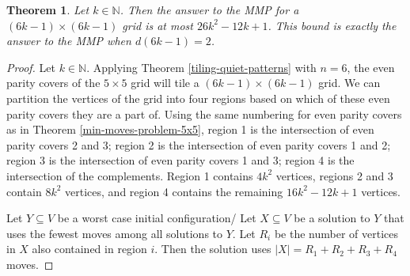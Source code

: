 \documentclass[a4paper]{article}
\newtheorem{theorem}{Theorem}
\newcommand{\N}{\mathbb{N}}
\newcommand{\abs}[1]{\left| #1 \right|}
\begin{document}
	\begin{theorem}\label{min-moves-problem-6k-1x6k-1}
		Let $k \in \N$.
		Then the answer to the MMP for a $(6k - 1) \times (6k - 1)$ grid is at most $26k^2 - 12k + 1$.
		This bound is exactly the answer to the MMP when $d(6k-1)=2$.
	\end{theorem}
	\begin{proof}
		Let $k \in \N$.
		Applying Theorem \ref{tiling-quiet-patterns} with $n=6$, the even parity covers of the $5 \times 5$ grid will tile a $(6k - 1) \times (6k - 1)$ grid.
		We can partition the vertices of the grid into four regions based on which of these even parity covers they are a part of.
		Using the same numbering for even parity covers as in Theorem \ref{min-moves-problem-5x5}, region 1 is the intersection of even parity covers 2 and 3;
		region 2 is the intersection of even parity covers 1 and 2;
		region 3 is the intersection of even parity covers 1 and 3;
		region 4 is the intersection of the complements.
		Region 1 contains $4k^2$ vertices, regions 2 and 3 contain $8k^2$ vertices, and region 4 contains the remaining $16k^2 - 12k + 1$ vertices.
		
		Let $Y \subseteq V$ be a worst case initial configuration/
		Let $X \subseteq V$ be a solution to $Y$ that uses the fewest moves among all solutions to $Y$.
		Let $R_i$ be the number of vertices in $X$ also contained in region $i$.
		Then the solution uses $\abs{X} = R_1 + R_2 + R_3 + R_4$ moves.
		

\end{proof}
\end{document}
